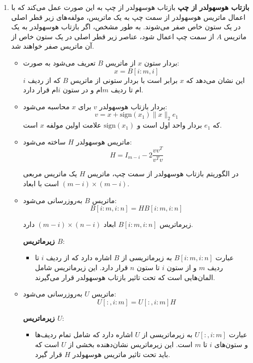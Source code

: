  
\begin{enumerate}
  \item \textbf{بازتاب هوسهولدر از چپ}
  بازتاب هوسهولدر از چپ به این صورت عمل می‌کند که با اعمال ماتریس هوسهولدر از      سمت چپ به یک ماتریس، مولفه‌های زیر قطر اصلی در یک ستون خاص صفر می‌شوند. به طور مشخص، اگر بازتاب هوسهولدر به یک ماتریس \( A \) از سمت چپ اعمال شود، عناصر زیر قطر اصلی در یک ستون خاص از آن ماتریس صفر خواهند شد.


  
  \begin{itemize}
    \item بردار ستون \( x \) از ماتریس \( B \) تعریف می‌شود به صورت:
    \[
    x = B[i:m, i]
    \]
این نشان می‌دهد که \( x \) برابر است با بردار ستونی از ماتریس \( B \) که از ردیف \( i \)ام تا ردیف \( m \)ام و در ستون \( i \)ام قرار دارد.
    
    \item بردار بازتاب هوسهولدر \( v \) برای \( x \) محاسبه می‌شود:
    \[
    v = x + \text{sign}(x_1) \|x\|_2 e_1
    \]
    که \( e_1 \) بردار واحد اول است و \(\text{sign}(x_1)\) علامت اولین مولفه \( x \) است.
    \item ماتریس هوسهولدر \( H \) ساخته می‌شود:
    \[
    H = I_{m-i} - 2 \frac{vv^T}{v^T v}
    \]

    در الگوریتم بازتاب هوسهولدر از سمت چپ، ماتریس \( H \) یک ماتریس مربعی است با ابعاد \( (m-i) \times (m-i) \). 
    \item ماتریس \( B \) به‌روزرسانی می‌شود:
    \[
    B[i:m, i:n] = H B[i:m, i:n]
    \]

    زیرماتریس \( B[i:m, i:n] \) ابعاد \( (m-i) \times (n-i) \) دارد.

    
     \textbf{زیرماتریس \( B \)}:
    \begin{itemize}
        \item عبارت \( B[i:m, i:n] \) به زیرماتریسی از \( B \) اشاره دارد که از ردیف \( i \) تا ردیف \( m \) و از ستون \( i \) تا ستون \( n \) قرار دارد. این زیرماتریس شامل المان‌هایی است که تحت تاثیر بازتاب هوسهولدر قرار می‌گیرند.
    \end{itemize}
    \item ماتریس \( U \) به‌روزرسانی می‌شود:
    \[
    U[:, i:m] = U[:, i:m] H
    \]

     \textbf{زیرماتریس \( U \)}:
    \begin{itemize}
        \item عبارت \( U[:, i:m] \) به زیرماتریسی از \( U \) اشاره دارد که شامل تمام ردیف‌ها و ستون‌های \( i \) تا \( m \) است. این زیرماتریس نشان‌دهنده بخشی از \( U \) است که باید تحت تاثیر ماتریس هوسهولدر \( H \) قرار گیرد.


\end{itemize}
\end{itemize}
\end{enumerate}
